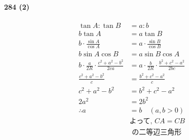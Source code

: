 \documentclass[fleqn,a4j,dvipdfmx,uplatex,twocolumn]{jsarticle}
\begin{document}
\paragraph{284 (2)}
\begin{align*}
  \tan A : \tan B &= a : b \\
  b \tan A &= a \tan B \\
  b \cdot \frac{\sin A}{\cos A} &= a \cdot \frac{\sin B}{\cos B} \\
  b \sin A \cos B &= a \sin B \cos A \\
  b \cdot \frac{a}{2R} \cdot \frac{c^2 + a^2 - b^2}{2ca} &= a \cdot \frac{b}{2R} \cdot \frac{b^2 + c^2 - a^2}{2bc} \\
  \frac{c^2 + a^2 - b^2}{c} &= \frac{b^2 + c^2 - a^2}{c} \\
  c^2 + a^2 - b^2 &= b^2 + c^2 - a^2 \\
  2a^2 &= 2b^2 \\
  \therefore a &= b \quad (a, b > 0) \\
  &\text{よって, } CA = CB\\
  &\text{ の二等辺三角形}
\end{align*}
\end{document}
